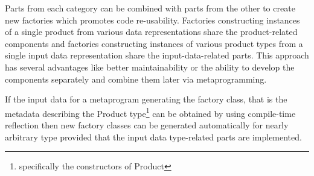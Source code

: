 Parts from each category can be combined with parts from the other to create new
factories which promotes code re-usability. Factories constructing instances of a single
product from various data representations share the product-related components
and factories constructing instances of various product types from a single input data representation
share the input-data-related parts. This approach has several advantages like better
maintainability or the ability to develop the components separately and combine them later
via metaprogramming.

If the input data for a metaprogram generating the factory class, that is
the metadata describing the Product type\footnote{specifically the constructors of Product}
can be obtained by using compile-time reflection then new factory classes can be generated
automatically for nearly arbitrary type provided that the input data type-related parts are
implemented.
